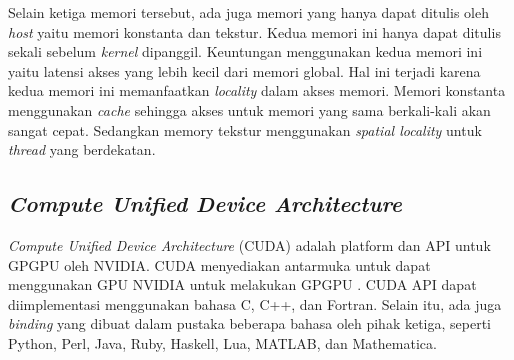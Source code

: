 
    Selain ketiga memori tersebut, ada juga memori yang hanya dapat ditulis oleh \emph{host} yaitu memori konstanta dan tekstur. Kedua memori ini hanya dapat ditulis sekali sebelum \emph{kernel} dipanggil. Keuntungan menggunakan kedua memori ini yaitu latensi akses yang lebih kecil dari memori global. Hal ini terjadi karena kedua memori ini memanfaatkan \emph{locality} dalam akses memori. Memori konstanta menggunakan \emph{cache} sehingga akses untuk memori yang sama berkali-kali akan sangat cepat. Sedangkan memory tekstur menggunakan \emph{spatial locality} untuk \emph{thread} yang berdekatan.

  
  
  
  \subsection{\emph{Compute Unified Device Architecture}}
  
    \emph{Compute Unified Device Architecture} (CUDA) adalah platform dan API untuk GPGPU oleh NVIDIA. CUDA menyediakan antarmuka untuk dapat menggunakan GPU NVIDIA untuk melakukan GPGPU \citep{cuda}. CUDA API dapat diimplementasi menggunakan bahasa C, C++, dan Fortran. Selain itu, ada juga \emph{binding} yang dibuat dalam pustaka beberapa bahasa oleh pihak ketiga, seperti Python, Perl, Java, Ruby, Haskell, Lua, MATLAB, dan Mathematica.
    
